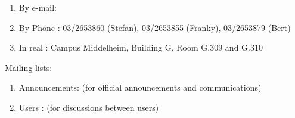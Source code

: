 \begin{enumerate}
\item  By e-mail:  \hpcinfo
\item  By Phone : 03/2653860 (Stefan), 03/2653855 (Franky), 03/2653879 (Bert)
\item  In real  : Campus Middelheim, Building G, Room G.309 and G.310
\end{enumerate}

Mailing-lists:

\begin{enumerate}
\item  Announcements: \hpcannounceml (for official announcements and communications)
\item  Users : \hpcusersml (for discussions between users)
\end{enumerate}

